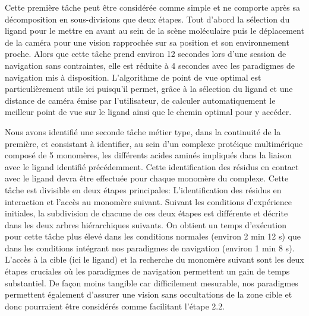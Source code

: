 Cette première tâche peut être considérée comme simple et ne comporte après sa décomposition en sous-divisions que deux étapes. Tout d'abord la sélection du ligand pour le mettre en avant au sein de la scène moléculaire puis le déplacement de la caméra pour une vision rapprochée sur sa position et son environnement proche. Alors que cette tâche prend environ 12 secondes lors d'une session de navigation sans contraintes, elle est réduite à 4 secondes avec les paradigmes de navigation mis à disposition. L'algorithme de point de vue optimal est particulièrement utile ici puisqu'il permet, grâce à la sélection du ligand et une distance de caméra émise par l'utilisateur, de calculer automatiquement le meilleur point de vue sur le ligand ainsi que le chemin optimal pour y accéder.

Nous avons identifié une seconde tâche métier type, dans la continuité de la première, et consistant à identifier, au sein d'un complexe protéique multimérique composé de 5 monomères, les différents acides aminés impliqués dans la liaison avec le ligand identifié précédemment. Cette identification des résidus en contact avec le ligand devra être effectuée pour chaque monomère du complexe. Cette tâche est divisible en deux étapes principales: L'identification des résidus en interaction et l'accès au monomère suivant. Suivant les conditions d'expérience initiales, la subdivision de chacune de ces deux étapes est différente et décrite dans les deux arbres hiérarchiques suivants. On obtient un temps d’exécution pour cette tâche plus élevé dans les conditions normales (environ 2 min 12 s) que dans les conditions intégrant nos paradigmes de navigation (environ 1 min 8 s). L'accès à la cible (ici le ligand) et la recherche du monomère suivant sont les deux étapes cruciales où les paradigmes de navigation permettent un gain de temps substantiel. De façon moins tangible car difficilement mesurable, nos paradigmes permettent également d'assurer une vision sans occultations de la zone cible et donc pourraient être considérés comme facilitant l'étape 2.2.
\\
\\
